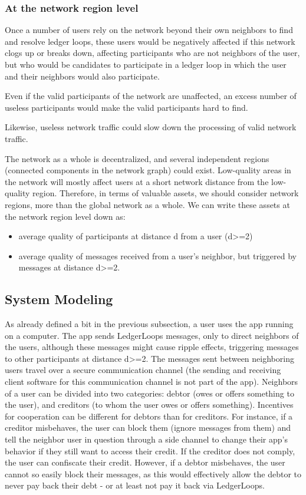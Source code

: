 \documentclass[11pt,twoside,a4paper]{article}
\begin{document}
\subsubsection{At the network region level}
Once a number of users rely on the network beyond their own neighbors to find and resolve ledger loops, these users would be negatively
affected if this network clogs up or breaks down, affecting participants who are not neighbors of the user, but who would be candidates
to participate in a ledger loop in which the user and their neighbors would also participate.

Even if the valid participants of the network are unaffected, an excess number of useless participants would make the valid participants hard to find.

Likewise, useless network traffic could slow down the processing of valid network traffic.

The network as a whole is decentralized, and several independent regions (connected components in the network graph) could exist.
Low-quality areas in the network will mostly affect users at a short network distance from the low-quality region. Therefore,
in terms of valuable assets, we should consider network regions, more than the global network as a whole. We can write these assets at
the network region level down as:

\begin{itemize}
\item average quality of participants at distance d from a user (d>=2)
\item average quality of messages received from a user's neighbor, but triggered by messages at distance d>=2.
\end{itemize}

\subsection{System Modeling}
As already defined a bit in the previous subsection, a user uses the app running on a computer. The app sends LedgerLoops messages, only to direct neighbors of the users, although these messages might cause ripple effects, triggering messages to other participants at distance d>=2.
The messages sent between neighboring users travel over a secure communication channel (the sending and receiving client software for this communication channel is not part of the app). Neighbors of a user can be divided into two categories: debtor (owes or offers something to the user), and creditors (to whom the user owes or offers something). Incentives for cooperation can be different for debtors than for creditors. For instance, if a creditor misbehaves, the user can block them (ignore messages from them) and tell the neighbor user in question through a side channel to change their app's behavior if they still want to access their credit. If the creditor does not comply, the user can confiscate their credit. However, if a debtor misbehaves, the user cannot so easily block their messages, as this would effectively allow the debtor to never pay back their debt - or at least not pay it back via LedgerLoops.
\end{document}
